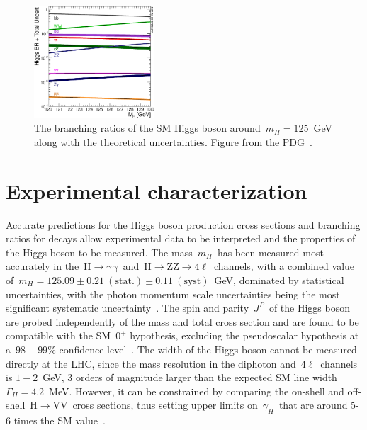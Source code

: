 \begin{figure}
\begin{centering}
\includegraphics[width=0.4\textwidth]{figures/theory/higgs_br.eps}
\caption[The branching ratios of the Higgs boson]{The branching ratios of the SM Higgs boson around~$m_H = 125$~GeV along with the theoretical uncertainties. Figure from the PDG~\cite{Patrignani:2016xqp}.}
\label{fig:higgs_br}
\end{centering}
\end{figure}

\section{Experimental characterization}
Accurate predictions for the Higgs boson production cross sections and branching ratios for decays allow experimental data to be interpreted and the properties of the Higgs boson to be measured. The mass~$m_H$~has been measured most accurately in the~$\mathrm{H}\rightarrow\mathrm{\gamma}\mathrm{\gamma}$~and~$\mathrm{H} \rightarrow \mathrm{Z}\mathrm{Z} \rightarrow 4\ell$~channels, with a combined value of~$m_H = 125.09 \pm 0.21~(\mathrm{stat}.) \pm 0.11~(\mathrm{syst})$~GeV, dominated by statistical uncertainties, with the photon momentum scale uncertainties being the most significant systematic uncertainty~\cite{Aad:2015zhl}. The spin and parity~$J^P$~of the Higgs boson are probed independently of the mass and total cross section and are found to be compatible with the SM~$0^+$ hypothesis, excluding the pseudoscalar hypothesis at a~$98-99\%$ confidence level~\cite{Khachatryan:2014kca,Aad:2013xqa}. The width of the Higgs boson cannot be measured directly at the LHC, since the mass resolution in the diphoton and~$4\ell$~channels is $1-2$~GeV, 3 orders of magnitude larger than the expected SM line width $\Gamma_H = 4.2$~MeV. However, it can be constrained by comparing the on-shell and off-shell~$\mathrm{H} \rightarrow \mathrm{VV}$~cross sections, thus setting upper limits on~$\gamma_H$~that are around 5-6 times the SM value~\cite{Khachatryan:2014iha}.

